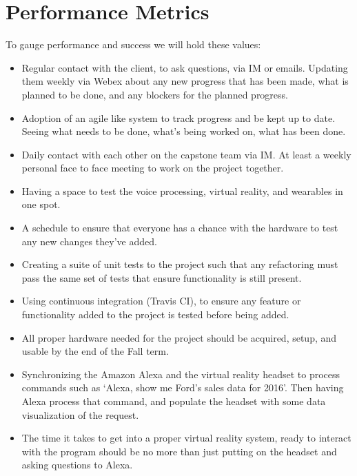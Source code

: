 \documentclass[onecolumn, draftclsnofoot,10pt, compsoc]{IEEEtran}
\begin{document}
\section{Performance Metrics}
To gauge performance and success we will hold these values: 
\begin{itemize}

\item Regular contact with the client, to ask questions, via IM or emails. Updating them weekly via Webex about any new progress that has been made, what is planned to be done, and any blockers for the planned progress.

\item Adoption of an agile like system to track progress and be kept up to date. Seeing what needs to be done, what’s being worked on, what has been done.

\item Daily contact with each other on the capstone team via IM. At least a weekly personal face to face meeting to work on the project together. 

\item Having a space to test the voice processing, virtual reality, and wearables in one spot.

\item A schedule to ensure that everyone has a chance with the hardware to test any new changes they’ve added. 

\item Creating a suite of unit tests to the project such that any refactoring must pass the same set of tests that ensure functionality is still present. 

\item Using continuous integration (Travis CI), to ensure any feature or functionality added to the project is tested before being added.

\item All proper hardware needed for the project should be acquired, setup, and usable by the end of the Fall term. 

\item Synchronizing the Amazon Alexa and the virtual reality headset to process commands such as ‘Alexa, show me Ford’s sales data for 2016’. Then having Alexa process that command, and populate the headset with some data visualization of the request.

\item The time it takes to get into a proper virtual reality system, ready to interact with the program should be no more than just putting on the headset and asking questions to Alexa. 


\end{itemize}
\end{document}
